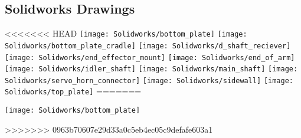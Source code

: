 \begin{flushleft}
\section{Solidworks Drawings}
\end{flushleft}
\label{app:SolidworksDrawings}
<<<<<<< HEAD
\centering
\texttt{[image: Solidworks/bottom\_plate]} \newpage
\texttt{[image: Solidworks/bottom\_plate\_cradle]} \newpage
\texttt{[image: Solidworks/d\_shaft\_reciever]} \newpage
\texttt{[image: Solidworks/end\_effector\_mount]} \newpage
\texttt{[image: Solidworks/end\_of\_arm]} \newpage
\texttt{[image: Solidworks/idler\_shaft]} \newpage
\texttt{[image: Solidworks/main\_shaft]} \newpage
\texttt{[image: Solidworks/servo\_horn\_connector]} \newpage
\texttt{[image: Solidworks/sidewall]} \newpage
\texttt{[image: Solidworks/top\_plate]} \newpage
=======
\begin{center}
\texttt{[image: Solidworks/bottom\_plate]} \newpage
\end{center}
>>>>>>> 0963b70607e29d33a0c5eb4ec05c9defafe603a1
